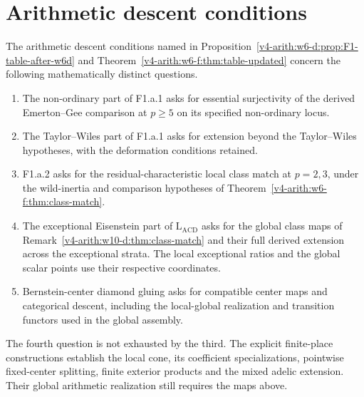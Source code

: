 \section{Arithmetic descent conditions}
\label{v4-arith:w10-d:residual-table}
\label{v4-arith:w10-d:prop:F1-table-after-w10d}
The arithmetic descent conditions named in
Proposition~\ref{v4-arith:w6-d:prop:F1-table-after-w6d} and
Theorem~\ref{v4-arith:w6-f:thm:table-updated} concern the following
mathematically distinct questions.
\begin{enumerate}
\item The non-ordinary part of F1.a.1 asks for essential surjectivity
of the derived Emerton--Gee comparison at $p\ge5$ on its specified
non-ordinary locus.
\item The Taylor--Wiles part of F1.a.1 asks for extension beyond the
Taylor--Wiles hypotheses, with the deformation conditions retained.
\item F1.a.2 asks for the residual-characteristic local class match
at $p=2,3$, under the wild-inertia and comparison hypotheses of
Theorem~\ref{v4-arith:w6-f:thm:class-match}.
\item The exceptional Eisenstein part of $\mathrm L_{\mathrm{ACD}}$
asks for the global class maps of
Remark~\ref{v4-arith:w10-d:thm:class-match} and their full derived
extension across the exceptional strata. The local exceptional
ratios and the global scalar points use their respective coordinates.
\item Bernstein-center diamond gluing asks for compatible center
maps and categorical descent, including the local-global realization
and transition functors used in the global assembly.
\end{enumerate}
The fourth question is not exhausted by the third.
The explicit finite-place constructions establish the local cone,
its coefficient specializations, pointwise fixed-center splitting,
finite exterior products and the mixed adelic extension.
Their global arithmetic realization still requires the maps above.

